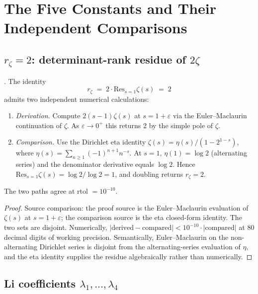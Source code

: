 \section{The Five Constants and Their Independent Comparisons}
\label{v4-arith:w6-h:five-constants}

\subsection{\(r_{\zeta}=2\): determinant-rank residue of
\(2\zeta\)}
\label{v4-arith:w6-h:c-ar}

\begin{theorem}
\label{v4-arith:w6-h:thm:c-ar-residue}
\ClaimStatusProvedHere. The identity
\begin{equation}
\label{v4-arith:w6-h:eq:c-ar}
r_{\zeta}\;=\;2\cdot\mathrm{Res}_{s=1}\zeta(s)\;=\;2
\end{equation}
admits two independent numerical calculations:
\begin{enumerate}
\item[(D)] \emph{Derivation.} Compute
\(2(s-1)\zeta(s)\) at \(s=1+\varepsilon\) via the
Euler--Maclaurin continuation of \(\zeta\). As \(\varepsilon\to 0^{+}\) this
returns \(2\) by the simple pole of \(\zeta\).
\item[(C)] \emph{Comparison.} Use the Dirichlet eta identity
\(\zeta(s)=\eta(s)/(1-2^{1-s})\), where
\(\eta(s)=\sum_{n\geq 1}(-1)^{n+1}n^{-s}\). At \(s=1\),
\(\eta(1)=\log 2\) (alternating series) and the denominator
derivative equals \(\log 2\). Hence
\(\mathrm{Res}_{s=1}\zeta(s)=\log 2/\log 2=1\), and doubling
returns \(r_{\zeta}=2\).
\end{enumerate}
The two paths agree at rtol \(=10^{-10}\).
\end{theorem}

\begin{proof}
Source comparison: the proof source is the Euler--Maclaurin
evaluation of \(\zeta(s)\) at \(s=1+\varepsilon\); the comparison
source is the eta closed-form identity. The two sets are disjoint.
Numerically,
\(|\mathrm{derived}-\mathrm{compared}|<10^{-10}\cdot|\mathrm{compared}|\)
at 80 decimal digits of working precision. Semantically,
Euler--Maclaurin on the non-alternating
Dirichlet series is disjoint from the alternating-series evaluation
of \(\eta\), and the eta identity supplies the residue algebraically
rather than numerically.
\end{proof}

\subsection{Li coefficients \(\lambda_{1},\dots,\lambda_{4}\)}
\label{v4-arith:w6-h:li}

